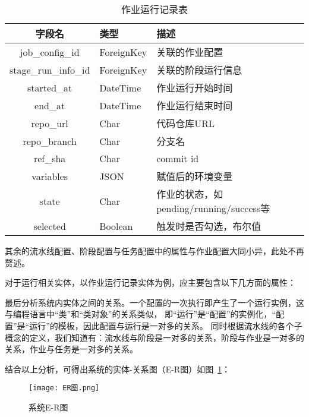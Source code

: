 \begin{table}[h]
  \centering
  \caption{作业运行记录表}
  \label{tab:作业运行记录表}
  \begin{tabular}{cll}
    \toprule
    字段名               & 类型          & 描述                                               \\
    \midrule
    job\_config\_id     & ForeignKey   & 关联的作业配置                                     \\
    stage\_run\_info\_id    & ForeignKey   & 关联的阶段运行信息                                 \\
    started\_at         & DateTime     & 作业运行开始时间                                   \\
    end\_at             & DateTime     & 作业运行结束时间                                   \\
    repo\_url           & Char         & 代码仓库URL                                      \\
    repo\_branch        & Char         & 分支名                                           \\
    ref\_sha            & Char         & commit id                                       \\
    variables           & JSON         & 赋值后的环境变量                                  \\
    state               & Char         & 作业的状态，如pending/running/success等            \\
    selected            & Boolean      & 触发时是否勾选，布尔值                             \\
    \bottomrule
  \end{tabular}
\end{table}

其余的流水线配置、阶段配置与任务配置中的属性与作业配置大同小异，此处不再赘述。

对于运行相关实体，以作业运行记录实体为例，应主要包含以下几方面的属性：

最后分析系统内实体之间的关系。一个配置的一次执行即产生了一个运行实例，这与编程语言中“类”和“类对象”的关系类似，
即“运行”是“配置”的实例化，“配置”是“运行”的模板，因此配置与运行是一对多的关系。
同时根据流水线的各个子概念的定义，我们知道有：流水线与阶段是一对多的关系，阶段与作业是一对多的关系，作业与任务是一对多的关系。

结合以上分析，可得出系统的实体-关系图（E-R图）如图~\ref{fig:系统E-R图}：

\begin{figure}[h]
  \centering
  \texttt{[image: ER图.png]}
  \caption{系统E-R图}
  \label{fig:系统E-R图}
\end{figure}


